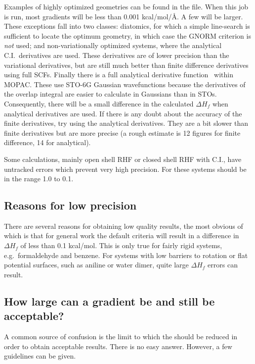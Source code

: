 Examples of highly optimized geometries can be found in the 
file.  When this job is run, most gradients will be less than 0.001
kcal/mol/\AA .  A few will be larger. These exceptions fall into two classes:
diatomics, for which a simple line-search is sufficient to locate the optimum
geometry, in which case the  GNORM criterion is {\em not} used; and
non-variationally optimized systems, where the analytical C.I.\ derivatives 
are used.  These derivatives are of lower precision than the variational
derivatives, but are still much better than finite difference derivatives using
full SCFs. 
Finally there is  a  full  analytical  derivative  function~\cite{analyt}
within  MOPAC.  These use STO-6G
Gaussian wavefunctions because the derivatives of the overlap integral are
easier to calculate  in  Gaussians  than  in STOs.  Consequently, there will be
a small difference in the calculated $\Delta H_f$ when analytical derivatives
are used.  If  there  is  any  doubt  about  the 
accuracy of the finite derivatives, try using the analytical derivatives.  They
are a bit slower than finite derivatives but are more precise  (a  rough 
estimate is 12 figures for finite difference, 14 for analytical).

Some calculations, mainly open shell RHF or closed shell  RHF  with C.I., have
untracked errors which prevent very high precision.  For these systems
 should be in the range 1.0 to 0.1.

\subsection{Reasons for low precision}
There are several reasons for obtaining low quality  results,   the most 
obvious  of which is that for general work the default criteria will result in 
a  difference  in  $\Delta H_f$   of  less  than  0.1 kcal/mol.    This   is  
only  true  for  fairly  rigid  systems,  e.g.\ formaldehyde and benzene.  For
systems with low barriers to rotation  or 
 flat  potential  surfaces,  such
as   aniline  or  water dimer, quite large $\Delta H_f$  errors can result.

\subsection{How large can a gradient be and still be acceptable?}
A common source of confusion is the limit to which the  should be 
reduced  in  order  to  obtain acceptable results.  There is no easy answer.
However, a few guidelines can be given.

